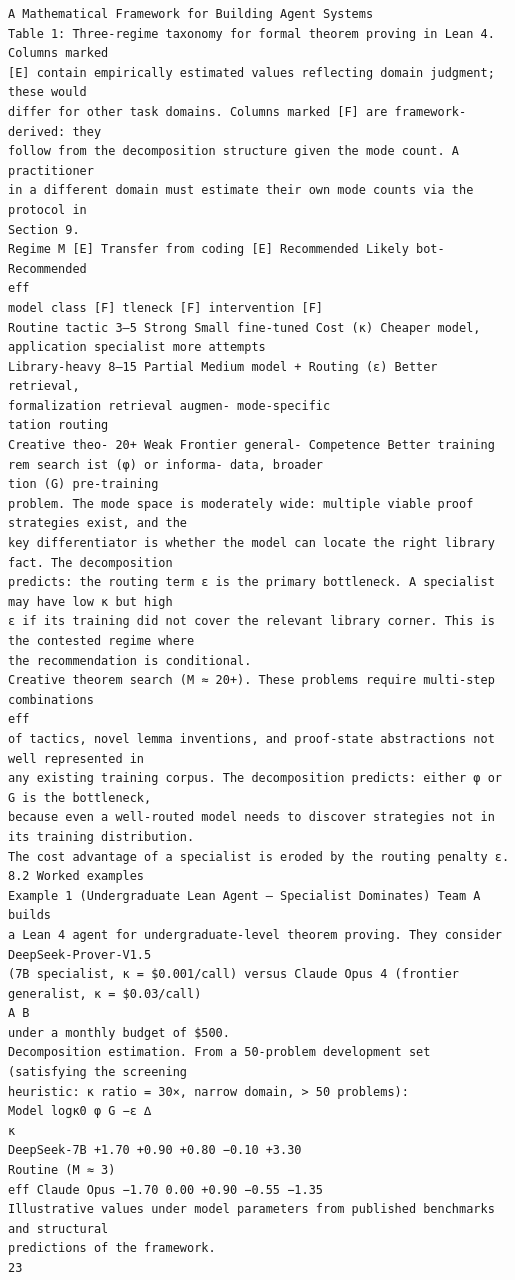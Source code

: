 \documentclass[11pt]{article}
\begin{document}
\begin{verbatim}
A Mathematical Framework for Building Agent Systems
Table 1: Three-regime taxonomy for formal theorem proving in Lean 4. Columns marked
[E] contain empirically estimated values reflecting domain judgment; these would
differ for other task domains. Columns marked [F] are framework-derived: they
follow from the decomposition structure given the mode count. A practitioner
in a different domain must estimate their own mode counts via the protocol in
Section 9.
Regime M [E] Transfer from coding [E] Recommended Likely bot- Recommended
eff
model class [F] tleneck [F] intervention [F]
Routine tactic 3–5 Strong Small fine-tuned Cost (κ) Cheaper model,
application specialist more attempts
Library-heavy 8–15 Partial Medium model + Routing (ε) Better retrieval,
formalization retrieval augmen- mode-specific
tation routing
Creative theo- 20+ Weak Frontier general- Competence Better training
rem search ist (φ) or informa- data, broader
tion (G) pre-training
problem. The mode space is moderately wide: multiple viable proof strategies exist, and the
key differentiator is whether the model can locate the right library fact. The decomposition
predicts: the routing term ε is the primary bottleneck. A specialist may have low κ but high
ε if its training did not cover the relevant library corner. This is the contested regime where
the recommendation is conditional.
Creative theorem search (M ≈ 20+). These problems require multi-step combinations
eff
of tactics, novel lemma inventions, and proof-state abstractions not well represented in
any existing training corpus. The decomposition predicts: either φ or G is the bottleneck,
because even a well-routed model needs to discover strategies not in its training distribution.
The cost advantage of a specialist is eroded by the routing penalty ε.
8.2 Worked examples
Example 1 (Undergraduate Lean Agent — Specialist Dominates) Team A builds
a Lean 4 agent for undergraduate-level theorem proving. They consider DeepSeek-Prover-V1.5
(7B specialist, κ = $0.001/call) versus Claude Opus 4 (frontier generalist, κ = $0.03/call)
A B
under a monthly budget of $500.
Decomposition estimation. From a 50-problem development set (satisfying the screening
heuristic: κ ratio = 30×, narrow domain, > 50 problems):
Model logκ0 φ G −ε ∆
κ
DeepSeek-7B +1.70 +0.90 +0.80 −0.10 +3.30
Routine (M ≈ 3)
eff Claude Opus −1.70 0.00 +0.90 −0.55 −1.35
Illustrative values under model parameters from published benchmarks and structural
predictions of the framework.
23
\end{verbatim}
\end{document}
